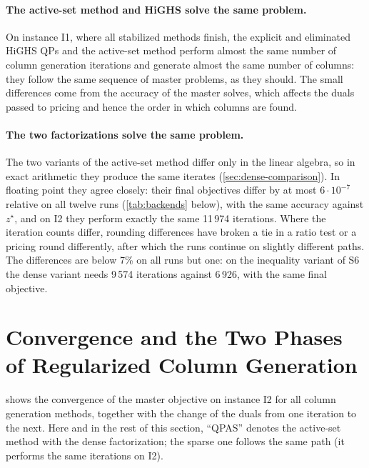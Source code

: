 \paragraph{The active-set method and HiGHS solve the same problem.} On instance I1, where
all stabilized methods finish, the explicit and eliminated HiGHS QPs and the active-set method
perform almost the same number of column generation iterations and generate almost the same
number of columns: they follow the same sequence of master problems, as they should. The small
differences come from the accuracy of the master solves, which affects the duals passed to
pricing and hence the order in which columns are found.

\paragraph{The two factorizations solve the same problem.} The two variants of the active-set
method differ only in the linear algebra, so in exact arithmetic they produce the same iterates
(\cref{sec:dense-comparison}). In floating point they agree closely: their final objectives
differ by at most $6\cdot10^{-7}$ relative on all twelve runs (\cref{tab:backends} below),
with the same accuracy against $z^\star$, and on I2 they perform exactly the same 11\,974
iterations. Where the iteration counts differ, rounding differences have broken a tie in a
ratio test or a pricing round differently, after which the runs continue on slightly
different paths. The differences are below 7\% on all runs but one: on the inequality
variant of S6 the dense variant needs 9\,574 iterations against 6\,926, with the same final
objective.


\section[Convergence and the Two Phases]{Convergence and the Two Phases of Regularized Column Generation}
\label{sec:results-phases}

 shows the convergence of the master objective on instance I2 for all
column generation methods, together with the change of the duals from one iteration to the
next. Here and in the rest of this section, ``QPAS'' denotes the active-set method with the
dense factorization; the sparse one follows the same path (it performs the same iterations on
I2).

